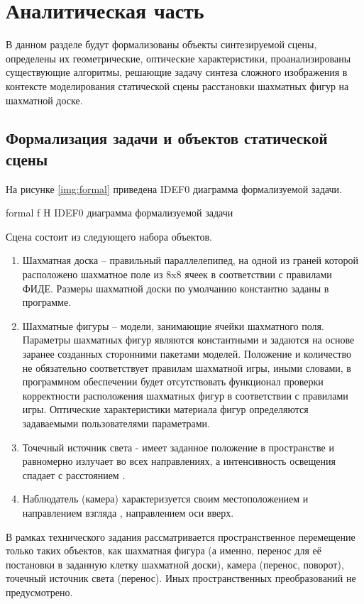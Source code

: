 \chapter{Аналитическая часть}

В данном разделе будут формализованы объекты синтезируемой сцены, определены их геометрические, оптические характеристики, проанализированы существующие алгоритмы, решающие задачу синтеза сложного изображения в контексте моделирования статической сцены расстановки шахматных фигур на шахматной доске.

\section{Формализация задачи и объектов статической сцены}

На рисунке \ref{img:formal} приведена IDEF0 диаграмма формализуемой задачи.

{formal}
{f}
{H}
{\textwidth}
{IDEF0 диаграмма формализуемой задачи}

Сцена состоит из следующего набора объектов.

\begin{enumerate}
	\item Шахматная доска – правильный параллелепипед, на одной из граней которой расположено шахматное поле из 8x8 ячеек в соответствии с правилами ФИДЕ. Размеры шахматной доски по умолчанию константно заданы в программе.
	\item Шахматные фигуры – модели, занимающие ячейки шахматного поля. Параметры шахматных фигур являются константными и задаются на основе заранее созданных сторонними пакетами моделей. Положение и количество не обязательно соответствует правилам шахматной игры, иными словами, в программном обеспечении будет отсутствовать функционал проверки корректности расположения шахматных фигур в соответствии с правилами игры. Оптические характеристики материала фигур определяются задаваемыми пользователями параметрами.
	\item Точечный источник света - имеет заданное положение в пространстве и равномерно излучает во всех направлениях, а интенсивность освещения спадает с расстоянием \cite{kurov:2023}. 
	\item Наблюдатель (камера) характеризуется своим местоположением и направлением взгляда \cite{kurov:2023}, направлением оси вверх.
\end{enumerate}

В рамках технического задания рассматривается пространственное перемещение только таких объектов, как шахматная фигура (а именно, перенос для её постановки в заданную клетку шахматной доски), камера (перенос, поворот), точечный источник света (перенос). Иных пространственных преобразований не предусмотрено.

